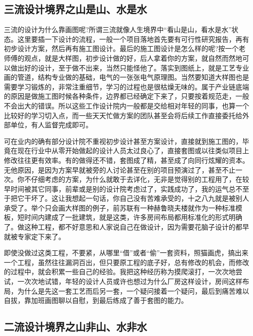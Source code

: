 \documentclass[]{book}
\begin{document}
\hypertarget{ux4e09ux6d41ux8bbeux8ba1ux5883ux754cux4e4bux5c71ux662fux5c71ux6c34ux662fux6c34}{%
\subsection{三流设计境界之山是山、水是水}\label{ux4e09ux6d41ux8bbeux8ba1ux5883ux754cux4e4bux5c71ux662fux5c71ux6c34ux662fux6c34}}

三流的设计为什么靠画图呢?所谓三流就像人生境界中``看山是山，看水是水''状态。这里要插一下设计的流程，一般一个项目落地首先要有可行性研究报告，再有初步设计方案，然后再有施工图设计。最后的施工图设计是怎么样的呢?按一个老师傅的观点，就是大样图，初步设计做的好，后人拿着你的方案，就自然而然地可以做出好的设计，至于做不出来，当然只能怪他了。落实到图纸上，就是工艺专业画的管道，结构专业做的基础，电气的一张张电气原理图。当然要知道大样图也是需要学习锻炼的，非常注重细节，学习的过程也是很枯燥无味的。属于产业链底端的原因是做施工图时候各种条件，边界都已经确定下来了，只要按着规范走，一般不会出大的错误。所以这些工作设计院内一般都是交给相对年轻的同事，也算一个比较好的学习切入点，而一些天天忙做方案的团队甚至会将后续工作直接委托给外部单位，有人监督完成即可。

可在业内的确有部分设计院不重视初步设计甚至方案设计，直接就到施工图的，毕竟在现在行业中从零开始做起的设计人员太过良心了，直接套图或以往类似项目上修改往往更有效率。有的做得还不错，套图成了精，甚至成了向同行炫耀的资本。无他原因，是因为方案早就被旁的人讨论甚至在别的项目预演过了，甚至不止一次。你不仔细考虑的方案，为什么就敢于去详化，无非是觉得别的工程用了，在较早时间被其它同事，前辈或是别的设计院考虑过了，实践成功了，我的运气总不至于把它干坏了。这让我想起一句话，你自己没有苦难承受的，十之八九就是被别人承受了。举个只会画大样图的例子，前苏联有一种赫鲁晓夫楼就作为一种标准模板，短时间内建成了一批建筑，就是这类，许多房间布局都用标准化的形式明确了。做这种工程，都不好意思和人家说自己在做设计，因为需要花脑子设计的都早就被专家定下来了。

即使没做过这类工程，不要紧，从哪里``借''或者``偷''一套资料，照猫画虎，搞出来一个工程，虽然往往漏洞百出，但只要原工程的底子好，总有修改的机会，而修改的过程中，就会积累一些自己的经验。我把这种经历称为摸爬滚打，一次次地尝试，一次次地试错，年轻的设计人员或许也想过为什么厂房这样设计，房间这样布局，为什么是先这一套工艺而后另一套，一个疑问接着一个疑问，最后到痛苦难以自拔，靠加班画图聊以自慰，到最后练成了善于套图的能力。

\hypertarget{ux4e8cux6d41ux8bbeux8ba1ux5883ux754cux4e4bux5c71ux975eux5c71ux6c34ux975eux6c34}{%
\subsection{二流设计境界之山非山、水非水}\label{ux4e8cux6d41ux8bbeux8ba1ux5883ux754cux4e4bux5c71ux975eux5c71ux6c34ux975eux6c34}}
\end{document}
